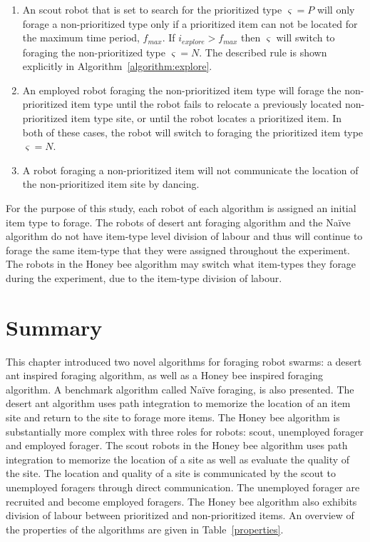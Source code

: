 \begin{enumerate}
\item An scout robot that is set to search for the prioritized type $\varsigma=P$ will only forage a non-prioritized type only if a prioritized item can not be located for the maximum time period, $f_{max}$. If $i_{explore} > f_{max}$ then $\varsigma$ will switch to foraging the non-prioritized type $\varsigma=N$. The described rule is shown explicitly in Algorithm~\ref{algorithm:explore}.
\item An employed robot foraging the non-prioritized item type will forage the non-prioritized item type until the robot fails to relocate a previously located non-prioritized item type site, or until the robot locates a prioritized item. In both of these cases, the robot will switch to foraging the prioritized item type $\varsigma=N$.
\item A robot foraging a non-prioritized item will not communicate the location of the non-prioritized item site by dancing. 
\end{enumerate}

For the purpose of this study, each robot of each algorithm is assigned an initial item type to forage. The robots of desert ant foraging algorithm and the Na\"ive algorithm do not have item-type level division of labour and thus will continue to forage the same item-type that they were assigned throughout the experiment. The robots in the Honey bee algorithm may switch what item-types they forage during the experiment, due to the item-type division of labour. 

\section{Summary}
\label{prioritized:summary}

This chapter introduced two novel algorithms for foraging robot swarms: a desert ant inspired foraging algorithm, as well as a Honey bee inspired foraging algorithm. A benchmark algorithm called Na\"ive foraging, is also presented. The desert ant algorithm uses path integration to memorize the location of an item site and return to the site to forage more items. The Honey bee algorithm is substantially more complex with three roles for robots: scout, unemployed forager and employed forager. The scout robots in the Honey bee algorithm uses path integration to memorize the location of a site as well as evaluate the quality of the site. The location and quality of a site is communicated by the scout to unemployed foragers through direct communication. The unemployed forager are recruited and become employed foragers. The Honey bee algorithm also exhibits division of labour between prioritized and non-prioritized items. An overview of the properties of the algorithms are given in Table~\ref{properties}.

